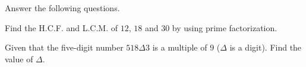  Answer the following questions.

\begin{subparts}
  \item Find the H.C.F. and L.C.M. of $12$, $18$ and $30$ by using prime factorization.

  \item Given that the five-digit number $518\Delta 3$ is a multiple of $9$ ($\Delta$ is a digit). Find the value of $\Delta$.
\end{subparts}

